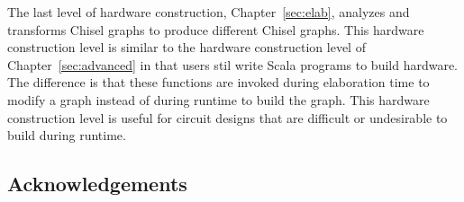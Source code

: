 The last level of hardware construction, Chapter~\ref{sec:elab},
analyzes and transforms Chisel graphs to produce different Chisel
graphs. This hardware construction level is similar to the hardware
construction level of Chapter~\ref{sec:advanced} in that users stil
write Scala programs to build hardware. The difference is that these
functions are invoked during elaboration time to modify a graph
instead of during runtime to build the graph. This hardware
construction level is useful for circuit designs that are difficult or
undesirable to build during runtime.

\subsection{Acknowledgements}
